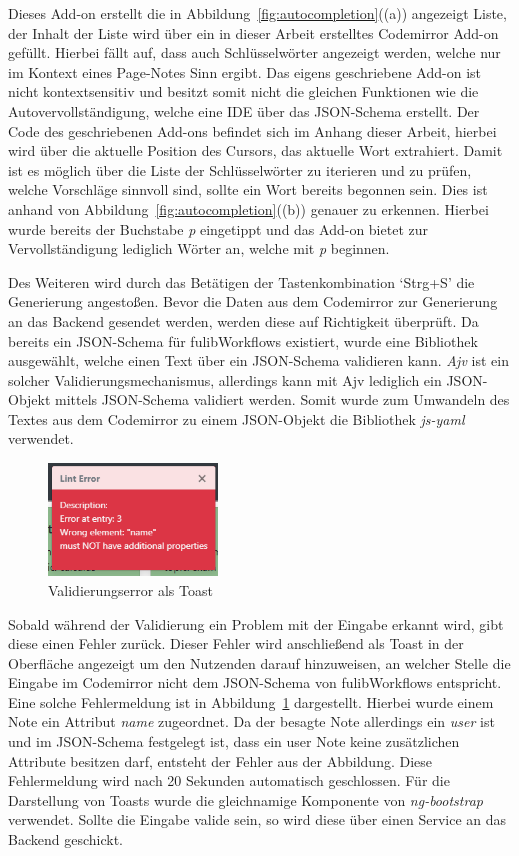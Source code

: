 Dieses Add-on erstellt die in Abbildung~\ref{fig:autocompletion}((a)) angezeigt Liste, der Inhalt der Liste wird über ein in dieser Arbeit erstelltes Codemirror Add-on gefüllt.
Hierbei fällt auf, dass auch Schlüsselwörter angezeigt werden, welche nur im Kontext eines Page-Notes Sinn ergibt.
Das eigens geschriebene Add-on ist nicht kontextsensitiv und besitzt somit nicht die gleichen Funktionen wie die Autovervollständigung, welche eine IDE über das JSON-Schema erstellt.
Der Code des geschriebenen Add-ons befindet sich im Anhang dieser Arbeit, hierbei wird über die aktuelle Position des Cursors, das aktuelle Wort extrahiert.
Damit ist es möglich über die Liste der Schlüsselwörter zu iterieren und zu prüfen, welche Vorschläge sinnvoll sind, sollte ein Wort bereits begonnen sein.
Dies ist anhand von Abbildung~\ref{fig:autocompletion}((b)) genauer zu erkennen.
Hierbei wurde bereits der Buchstabe \textit{p} eingetippt und das Add-on bietet zur Vervollständigung lediglich Wörter an, welche mit \textit{p} beginnen.

Des Weiteren wird durch das Betätigen der Tastenkombination `Strg+S' die Generierung angestoßen.
Bevor die Daten aus dem Codemirror zur Generierung an das Backend gesendet werden, werden diese auf Richtigkeit überprüft.
Da bereits ein JSON-Schema für fulibWorkflows existiert, wurde eine Bibliothek ausgewählt, welche einen Text über ein JSON-Schema validieren kann.
\textit{Ajv} ist ein solcher Validierungsmechanismus, allerdings kann mit Ajv lediglich ein JSON-Objekt mittels JSON-Schema validiert werden.\cite*{ajv}
Somit wurde zum Umwandeln des Textes aus dem Codemirror zu einem JSON-Objekt die Bibliothek \textit{js-yaml} verwendet.\cite*{js-yaml}

\begin{figure}[h]
    \centering
    \includegraphics[width=0.4\textwidth]{images/3.2/error-toast}
    \caption{Validierungserror als Toast}
    \label{fig:error-toast}
\end{figure}

Sobald während der Validierung ein Problem mit der Eingabe erkannt wird, gibt diese einen Fehler zurück.
Dieser Fehler wird anschließend als Toast in der Oberfläche angezeigt um den Nutzenden darauf hinzuweisen, an welcher Stelle die Eingabe im Codemirror nicht
dem JSON-Schema von fulibWorkflows entspricht.
Eine solche Fehlermeldung ist in Abbildung~\ref{fig:error-toast} dargestellt.
Hierbei wurde einem Note ein Attribut \textit{name} zugeordnet.
Da der besagte Note allerdings ein \textit{user} ist und im JSON-Schema festgelegt ist, dass ein user Note keine zusätzlichen Attribute besitzen darf, entsteht der Fehler aus
der Abbildung.
Diese Fehlermeldung wird nach 20 Sekunden automatisch geschlossen.
Für die Darstellung von Toasts wurde die gleichnamige Komponente von \textit{ng-bootstrap} verwendet.
Sollte die Eingabe valide sein, so wird diese über einen Service an das Backend geschickt.

